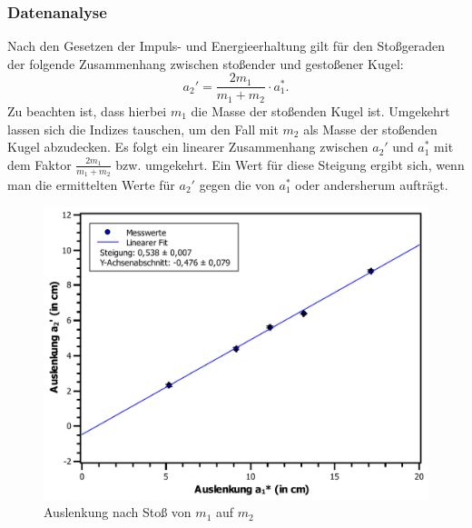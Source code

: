 		\subsubsection{Datenanalyse}	
			
			Nach den Gesetzen der Impuls- und Energieerhaltung gilt für den Stoßgeraden der folgende Zusammenhang zwischen stoßender und gestoßener Kugel:
			\begin{equation}
				a_2' = \frac{2m_\text{1}}{m_\text{1}+m_\text{2}} \cdot a_1^{*}.
			\end{equation}
			Zu beachten ist, dass hierbei $m_1$ die Masse der stoßenden Kugel ist. Umgekehrt lassen sich die Indizes tauschen, um den Fall mit $m_2$ als Masse der stoßenden Kugel abzudecken. Es folgt ein linearer Zusammenhang zwischen $a_2'$ und $a_1^{*}$ mit dem Faktor $\frac{2m_\text{1}}{m_\text{1}+m_\text{2}}$ bzw. umgekehrt. Ein Wert für diese Steigung ergibt sich, wenn man die ermittelten Werte für $a_2'$ gegen die von $a_1^{*}$ oder andersherum aufträgt.
			\begin{figure}[ht]
				\centering
				\includegraphics[width=\textwidth]{AuslenkungMittel.pdf}
				\caption{Auslenkung nach Stoß von $m_1$ auf $m_2$}
				\label{abb:AuslenkungMittel}	
			\end{figure}
